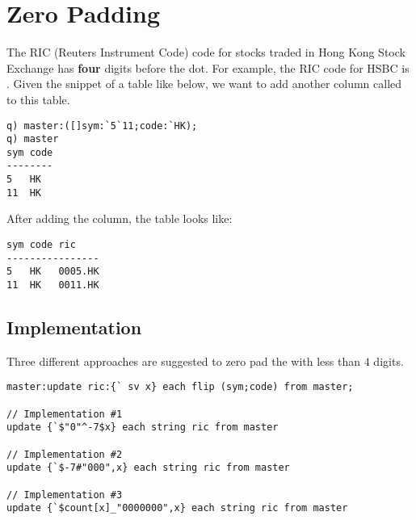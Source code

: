 \section{Zero Padding}

The RIC (Reuters Instrument Code) code for stocks traded in Hong Kong Stock Exchange has \textbf{four} digits before the dot. For example, the RIC code for HSBC is . Given the snippet of a table like below, we want to add another column called  to this table.

\begin{verbatim}
q) master:([]sym:`5`11;code:`HK);
q) master
sym code
--------
5   HK
11  HK
\end{verbatim}

After adding the  column, the table looks like:
\begin{verbatim}
sym code ric
----------------
5   HK   0005.HK
11  HK   0011.HK
\end{verbatim}

\subsection{Implementation}
Three different approaches are suggested to zero pad the  with less than $4$ digits.

\begin{verbatim}
master:update ric:{` sv x} each flip (sym;code) from master;

// Implementation #1
update {`$"0"^-7$x} each string ric from master

// Implementation #2
update {`$-7#"000",x} each string ric from master

// Implementation #3
update {`$count[x]_"0000000",x} each string ric from master
\end{verbatim}

